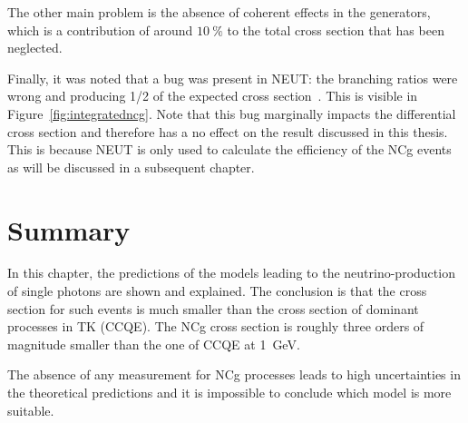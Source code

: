 The other main problem is the absence of coherent effects in the
generators, which is a contribution of around $10~\%$ to the total
cross section that has been neglected.

Finally, it was noted that a bug was present in \Gls{NEUT}: the
branching ratios were wrong and producing 1/2 of the expected cross
section~\cite{Kendall2015}. This is visible in
Figure~\ref{fig:integratedncg}. Note that this bug marginally impacts
the differential cross section and therefore has a no effect on the
result discussed in this thesis. This is because \Gls{NEUT} is only
used to calculate the efficiency of the \Gls{NCg} events as will be
discussed in a subsequent chapter.



\section{Summary}
\label{sec:phenosummary}
In this chapter, the predictions of the models leading to the
neutrino-production of single photons are shown and explained. The
conclusion is that the cross section for such events is much smaller
than the cross section of dominant processes in \Gls{TK}
(\Gls{CCQE}). The \Gls{NCg} cross section is roughly three orders of
magnitude smaller than the one of \Gls{CCQE} at 1~GeV.

The absence of any measurement for \Gls{NCg} processes leads to high
uncertainties in the theoretical predictions and it is impossible to
conclude which model is more suitable.














